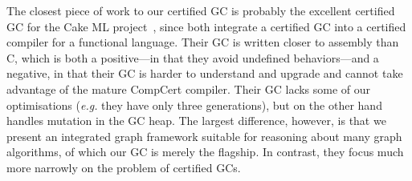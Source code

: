 The closest piece of work to our certified GC is probably the excellent certified GC
for the Cake ML project~\cite{cakemlgc}, since both integrate a certified GC into 
a certified compiler for a functional language.  Their GC is written closer to assembly 
than C, which is both a positive---in that they avoid undefined behaviors---and a negative, 
in that their GC is harder to understand and upgrade and cannot take advantage of the
mature CompCert compiler.  Their GC lacks some of our optimisations (\emph{e.g.} they have 
only three generations), but on the other hand handles mutation in the GC heap.  The largest 
difference, however, is that we present an integrated graph framework suitable for reasoning 
about many graph algorithms, of which our GC is merely the flagship.  In contrast, they focus 
much more narrowly on the problem of certified GCs.
